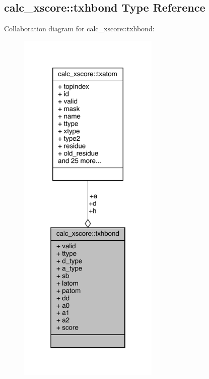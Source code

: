 \hypertarget{structcalc__xscore_1_1txhbond}{\subsection{calc\-\_\-xscore\-:\-:txhbond Type Reference}
\label{structcalc__xscore_1_1txhbond}
}


Collaboration diagram for calc\-\_\-xscore\-:\-:txhbond\-:
\nopagebreak
\begin{figure}[H]
\begin{center}
\leavevmode
\includegraphics[width=190pt]{structcalc__xscore_1_1txhbond__coll__graph}
\end{center}
\end{figure}
